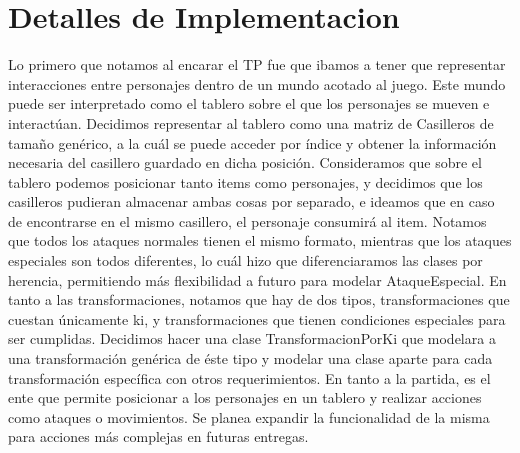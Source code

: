 \documentclass[a4paper]{article}
\begin{document}
\section{Detalles de Implementacion}
Lo primero que notamos al encarar el TP fue que ibamos a tener que representar interacciones entre personajes dentro de un mundo acotado al juego. Este mundo puede ser interpretado como el tablero sobre el que los personajes se mueven e interactúan. 
Decidimos representar al tablero como una matriz de Casilleros de tamaño genérico, a la cuál se puede acceder por índice y obtener la información necesaria del casillero guardado en dicha posición.
Consideramos que sobre el tablero podemos posicionar tanto items como personajes, y decidimos que los casilleros pudieran almacenar ambas cosas por separado, e ideamos que en caso de encontrarse en el mismo casillero, el personaje consumirá al item.
Notamos que todos los ataques normales tienen el mismo formato, mientras que los ataques especiales son todos diferentes, lo cuál hizo que diferenciaramos las clases por herencia, permitiendo más flexibilidad a futuro para modelar AtaqueEspecial.
En tanto a las transformaciones, notamos que hay de dos tipos, transformaciones que cuestan únicamente ki, y transformaciones que tienen condiciones especiales para ser cumplidas. Decidimos hacer una clase TransformacionPorKi que modelara a una transformación genérica de éste tipo y modelar una clase aparte para cada transformación específica con otros requerimientos.
En tanto a la partida, es el ente que permite posicionar a los personajes en un tablero y realizar acciones como ataques o movimientos. Se planea expandir la funcionalidad de la misma para acciones más complejas en futuras entregas. 
\end{document}
